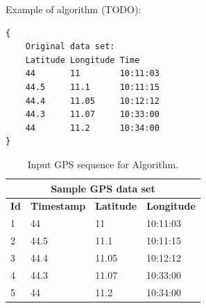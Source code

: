 Example of algorithm (TODO):
\begin{verbatim}
{
	Original data set:			
	Latitude Longitude Time
	44		 11		   10:11:03
	44.5	 11.1	   10:11:15
	44.4	 11.05	   10:12:12
	44.3	 11.07	   10:33:00
	44	     11.2	   10:34:00
}
\end{verbatim}

\begin{table}[]
  \centering
  \begin{tabular}{|l|l|l|l|}
    \hline
    \multicolumn{4}{|c|}{\textbf{Sample GPS data set}}           \\ \hline
    \textbf{Id} & \textbf{Timestamp} & \textbf{Latitude} & \textbf{Longitude} \\ \hline
    1 & 44              & 11         & 10:11:03    \\ \hline
    2 & 44.5            & 11.1       & 10:11:15    \\ \hline
    3 & 44.4            & 11.05      & 10:12:12    \\ \hline
    4 & 44.3            & 11.07      & 10:33:00    \\ \hline
    5 & 44              & 11.2       & 10:34:00    \\ \hline
  \end{tabular}
    \caption{Input GPS sequence for Algorithm.}
  \label{algo-input}
\end{table}


